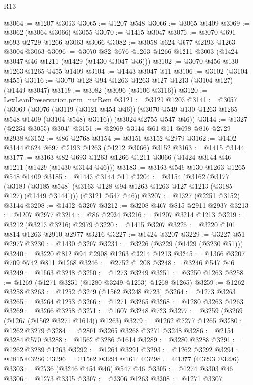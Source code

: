 \begin{lexlean}{R13}
\begin{coremodule}
@3064 := @1207 @3063
@3065 := @1207 @548
@3066 := @3065 @1409
@3069 := @3062 (@3064 @3066) @3055
@3070 := @1415 @3047
@3076 := @3070 @691 @693 @2729 @1266 @3063 @3066
@3082 := @3058 @624 @677 @2193 @1263 @3004 @3063
@3096 := @3070 @82 @676 @1263 @1266 @1211 @3003 (@1424 @3047 @46 @1211 (@1429 (@1430 @3047 @46)))
@3102 := @3070 @456 @130 @1263 @1265 @455 @1409
@3104 := @1443 @3047 @11
@3106 := @3102 (@3104 @455)
@3116 := @3070 @128 @94 @1263 @1263 @127 @1213 (@3104 @127) (@1449 @3047)
@3119 := @3082 (@3096 (@3106 @3116))
@3120 := LexLeanPreservation.prim_natRem
@3121 := @3120 @1203
@3141 := @3057
    (@3069
      (@3076 (@3119 (@3121 @454 @46)) (@3070 @549 @130 @1263 @1265 @548 @1409 (@3104 @548) @3116))
      (@3024 @2755 @547 @46))
@3144 := @1327 (@2254 @3055) @3047
@3151 := @2969 @3144 @61 @11 @698 @816 @2729 @2938
@3152 := @86 @2768
@3154 := @3151 @3152 @2979
@3162 := @1402 @3144 @624 @697 @2193 @1263 (@1212 @3066) @3152
@3163 := @1415 @3144
@3177 := @3163 @82 @693 @1263 @1266 @1211 @3066 (@1424 @3144 @46 @1211 (@1429 (@1430 @3144 @46)))
@3183 := @3163 @549 @130 @1263 @1265 @548 @1409
@3185 := @1443 @3144 @11
@3204 := @3154
    (@3162
      (@3177
        (@3183 (@3185 @548) (@3163 @128 @94 @1263 @1263 @127 @1213 (@3185 @127) (@1449 @3144))))
      (@3121 @547 @46))
@3207 := @1327 (@2251 @3152) @3144
@3208 := @1402 @3207
@3212 := @3208 @467 @815 @2911 @2937
@3213 := @1207 @2977
@3214 := @86 @2934
@3216 := @1207 @3214 @1213
@3219 := @3212 (@3213 @3216) @2979
@3220 := @1415 @3207
@3226 := @3220 @101 @814 @1263 @2910 @2977 @3216
@3227 := @1424 @3207
@3229 := @3227 @51 @2977
@3230 := @1430 @3207
@3234 := @3226 (@3229 (@1429 (@3230 @51)))
@3240 := @3220 @812 @94 @2908 @1263 @3214 @1213
@3245 := @1366 @3207 @709 @742 @811 @1268
@3246 := @2752 @1208
@3248 := @3246 @547 @46
@3249 := @1563 @3248
@3250 := @1273 @3249
@3251 := @3250 @1263
@3258 := @1269 (@1271 @3251 (@1280 @3249 @1263) @1268 @1265)
@3259 := @1262 @3258
@3263 := @1262 @3249 (@1562 @3248 @723)
@3264 := @1273 @3263
@3265 := @3264 @1263
@3266 := @1271 @3265
@3268 := @1280 @3263 @1263
@3269 := @3266 @3268
@3271 := @1607 @3248 @723
@3277 := @3259 (@3269 (@1267 (@1562 @3271 @1614)) @1263)
@3279 := @1262 @3277 @1265
@3280 := @1262 @3279
@3284 := @2801 @3265 @3268 @3271 @3248
@3286 := @2154 @3284 @570
@3288 := @1562 @3286 @1614
@3289 := @3280 @3288
@3291 := @1262 @3289 @1263
@3292 := @1264 @3291
@3293 := @1262 @3292
@3294 := @2815 @3286
@3296 := @1562 @3294 @1614
@3298 := @1377 (@3293 @3296)
@3303 := @2736 (@3246 @454 @46) @547 @46
@3305 := @1274 @3303 @46
@3306 := @1273 @3305
@3307 := @3306 @1263
@3308 := @1271 @3307

\end{coremodule}
\end{lexlean}
